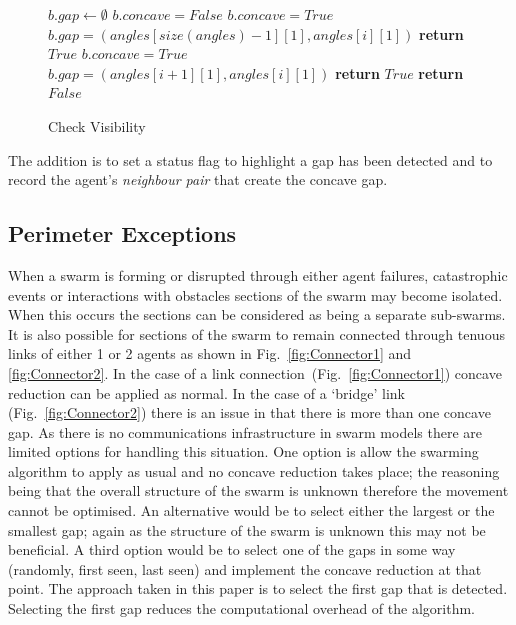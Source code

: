 \documentclass{ieeeaccess}
\begin{document}
\begin{figure}
\begin{algorithmic}[1]
{}
\State $b.gap \leftarrow \emptyset$
\State $b.concave = False$
\State $b.concave = True$
\State $b.gap = (angles[size(angles)-1][1],angles[i][1])$
\EndIf
   \State\textbf{return} $True$
   \EndIf
\EndIf
{}
\State $b.concave = True$\;
\State $b.gap = (angles[i + 1][1],angles[i][1])$
  \EndIf
  \State\textbf{return} $True$
\EndIf
\EndFor
\State\textbf{return} $False$
\EndProcedure
\end{algorithmic}
\caption{Check Visibility}
\label{algo:checkVisibility2}
\end{figure}

The addition is to set a status flag to highlight a gap has been detected and to record the agent's \textit{neighbour pair} that create the concave gap.

\subsection{Perimeter Exceptions}\label{concave:Exceptions}
When a swarm is forming or disrupted through either agent failures, catastrophic events or interactions with obstacles sections of the swarm may become isolated. When this occurs the sections can be considered as being a separate sub-swarms. It is also possible for sections of the swarm to remain connected through tenuous links of either 1 or 2 agents as shown in Fig.~\ref{fig:Connector1} and \ref{fig:Connector2}. In the case of a link connection~(Fig.~\ref{fig:Connector1}) concave reduction can be applied as normal. In the case of a `bridge' link (Fig.~\ref{fig:Connector2}) there is an issue in that there is more than one concave gap. As there is no communications infrastructure in swarm models there are limited options for handling this situation. One option is allow the swarming algorithm to apply as usual and no concave reduction takes place; the reasoning being that the overall structure of the swarm is unknown therefore the movement cannot be optimised. An alternative would be to select either the largest or the smallest gap; again as the structure of the swarm is unknown this may not be beneficial. A third option would be to select one of the gaps in some way (randomly, first seen, last seen) and implement the concave reduction at that point. The approach taken in this paper is to select the first gap that is detected. Selecting the first gap reduces the computational overhead of the algorithm.
\end{document}
